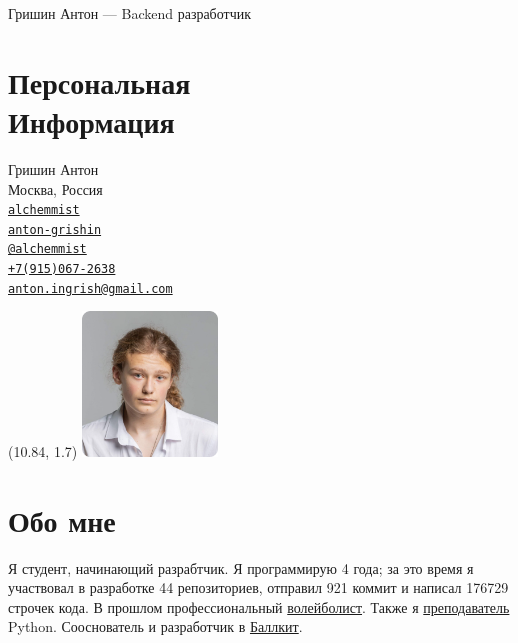 \documentclass[margin,line]{resume}
\begin{document}
{\sc \large Гришин Антон --- Backend разработчик} \\
\begin{resume}
  \begin{minipage}[t]{0.55\textwidth}
    \section{\mysidestyle Персональная\\Информация}
    Гришин Антон \\
    Москва, Россия \\
    \faGithub  \space
    \href{https://github.com/alchemmist/}{\texttt{alchemmist}} \\
    \faLinkedin \space
    \href{https://www.linkedin.com/in/anton-grishin-6966a8362/}{\texttt{anton-grishin}}
    \\
    \faPaperPlane \space \href{https://t.me/alchemmist}{\texttt{@alchemmist}} \\
    \faPhone \space
    \href{tel:+1234567890}{\color{blue}\texttt{+7(915)067-2638}}  \\
    \faEnvelope \space
    \href{mailto:anton.ingrish@gmail.com}{\color{blue}\texttt{anton.ingrish@gmail.com}}
  \end{minipage}

  \begin{minipage}[H]{0.18\textwidth}
    \begin{textblock}{7}(10.84, 1.7)
      \includegraphics[width=0.27\textwidth]{images/avatar.png}
    \end{textblock}
  \end{minipage}

  \vspace{-5mm}
  \section{\mysidestyle Обо мне}
  Я студент, начинающий разрабтчик. Я программирую 4 года; за
  это время я участвовал в разработке 44 репозиториев, отправил 921
  коммит и написал
  176729 строчек кода. В прошлом профессиональный
  \href{https://github.com/alchemmist/CV/blob/main/attachments/sport.pdf}{волейболист}.
  Также я
  \href{https://www.avito.ru/moskva/predlozheniya_uslug/prepodavatel_programmirovaniya_na_python_2556461612}{преподаватель}
  Python. Сооснователь и разработчик в \href{https://ballkit.ru/}{Баллкит}.


\end{resume}
\end{document}
